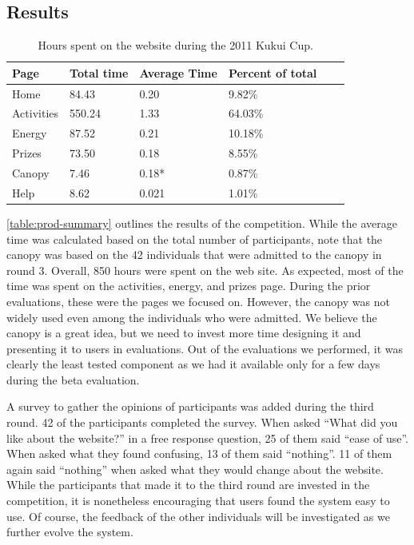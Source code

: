 \subsection{Results}

\begin{table}[t]
	\begin{tabular}{| l || l | l | l | l | l |}
		\hline
		Page & Total time & Average Time & Percent of total \\
		\hline
		Home & 84.43 & 0.20 & 9.82\% \\
    Activities & 550.24 & 1.33 & 64.03\% \\
    Energy & 87.52 & 0.21 & 10.18\% \\
    Prizes & 73.50 & 0.18 & 8.55\% \\
    Canopy & 7.46 & 0.18* & 0.87\% \\
    Help & 8.62 & 0.021 & 1.01\% \\
		\hline
	\end{tabular}
	\caption{Hours spent on the website during the 2011 Kukui Cup.}
	\label{table:prod-summary}
\end{table}

\autoref{table:prod-summary} outlines the results of the competition. While the average time was calculated based on the total number of participants, note that the canopy was based on the 42 individuals that were admitted to the canopy in round 3. Overall, 850 hours were spent on the web site. As expected, most of the time was spent on the activities, energy, and prizes page. During the prior evaluations, these were the pages we focused on. However, the canopy was not widely used even among the individuals who were admitted. We believe the canopy is a great idea, but we need to invest more time designing it and presenting it to users in evaluations. Out of the evaluations we performed, it was clearly the least tested component as we had it available only for a few days during the beta evaluation.

A survey to gather the opinions of participants was added during the third round. 42 of the participants completed the survey. When asked ``What did you like about the website?'' in a free response question, 25 of them said ``ease of use''. When asked what they found confusing, 13 of them said ``nothing''. 11 of them again said ``nothing'' when asked what they would change about the website. While the participants that made it to the third round are invested in the competition, it is nonetheless encouraging that users found the system easy to use. Of course, the feedback of the other individuals will be investigated as we further evolve the system.

